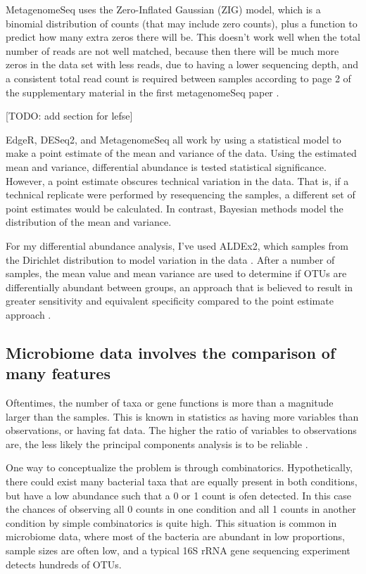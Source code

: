 MetagenomeSeq uses the Zero-Inflated Gaussian (ZIG) model, which is a binomial distribution of counts (that may include zero counts), plus a function to predict how many extra zeros there will be. This doesn’t work well when the total number of reads are not well matched, because then there will be much more zeros in the data set with less reads, due to having a lower sequencing depth, and a consistent total read count is required between samples according to page 2 of the supplementary material in the first metagenomeSeq paper \cite{paulson2014metagenomeseq}.

[TODO: add section for lefse]

EdgeR, DESeq2, and MetagenomeSeq all work by using a statistical model to make a point estimate of the mean and variance of the data. Using the estimated mean and variance, differential abundance is tested statistical significance. However, a point estimate obscures technical variation in the data. That is, if a technical replicate were performed by resequencing the samples, a different set of point estimates would be calculated. In contrast, Bayesian methods model the distribution of the mean and variance.

For my differential abundance analysis, I’ve used ALDEx2, which samples from the Dirichlet distribution to model variation in the data \cite{fernandes2014unifying}. After a number of samples, the mean value and mean variance are used to determine if OTUs are differentially abundant between groups, an approach that is believed to result in greater sensitivity and equivalent specificity compared to the point estimate approach \cite{fernandes2014unifying}.

\subsection{Microbiome data involves the comparison of many features}
Oftentimes, the number of taxa or gene functions is more than a magnitude larger than the samples. This is known in statistics as having more variables than observations, or having fat data. The higher the ratio of variables to observations are, the less likely the principal components analysis is to be reliable \cite{osborne2004sample}.

One way to conceptualize the problem is through combinatorics. Hypothetically, there could exist many bacterial taxa that are equally present in both conditions, but have a low abundance such that a 0 or 1 count is ofen detected. In this case the chances of observing all 0 counts in one condition and all 1 counts in another condition by simple combinatorics is quite high. This situation is common in microbiome data, where most of the bacteria are abundant in low proportions, sample sizes are often low, and a typical 16S rRNA gene sequencing experiment detects hundreds of OTUs.

